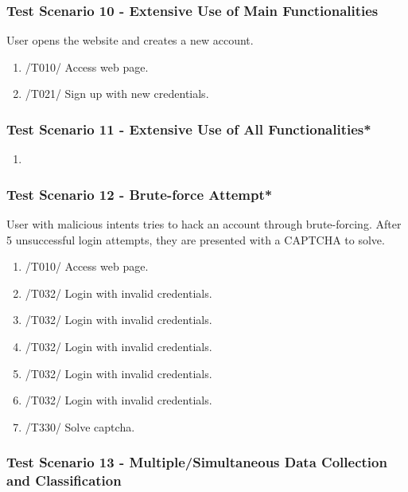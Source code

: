 \subsubsection{Test Scenario 10 - Extensive Use of Main Functionalities}
User opens the website and creates a new account. 
\begin{enumerate}
    \item /T010/ Access web page.
    \item /T021/ Sign up with new credentials.
\end{enumerate}
\subsubsection{Test Scenario 11 - Extensive Use of All Functionalities*}

\begin{enumerate}
    \item 
\end{enumerate}
\subsubsection{Test Scenario 12 - Brute-force Attempt*}
User with malicious intents tries to hack an account through brute-forcing. After 5 unsuccessful login attempts, they are presented with a CAPTCHA to solve.
\begin{enumerate}
    \item /T010/ Access web page.
    \item /T032/ Login with invalid credentials.
    \item /T032/ Login with invalid credentials.
    \item /T032/ Login with invalid credentials.
    \item /T032/ Login with invalid credentials.
    \item /T032/ Login with invalid credentials.
    \item /T330/ Solve captcha.
\end{enumerate}
\subsubsection{Test Scenario 13 - Multiple/Simultaneous Data Collection and Classification}
